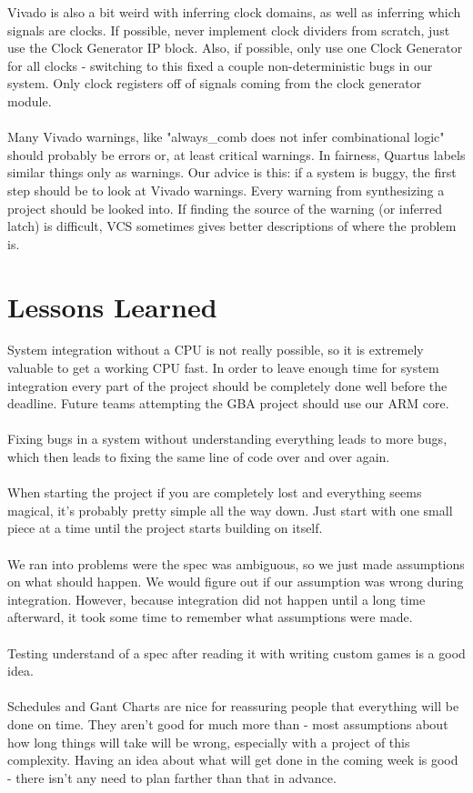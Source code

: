 \documentclass[11pt,a4paper]{article}
\begin{document}
	Vivado is also a bit weird with inferring clock domains, as well as inferring which signals are clocks. If possible, never implement clock dividers from scratch, just use the Clock Generator IP block. Also, if possible, only use one Clock Generator for all clocks - switching to this fixed a couple non-deterministic bugs in our system. Only clock registers off of signals coming from the clock generator module.\\\\
	Many Vivado warnings, like "always\_comb does not infer combinational logic" should probably be errors or, at least critical warnings. In fairness, Quartus labels similar things only as warnings. Our advice is this: if a system is buggy, the first step should be to look at Vivado warnings. Every warning from synthesizing a project should be looked into. If finding the source of the warning (or inferred latch) is difficult, VCS sometimes gives better descriptions of where the problem is. 
	
	\section{Lessons Learned}
	System integration without a CPU is not really possible, so it is extremely valuable to get a working CPU fast.  In order to leave enough time for system integration every part of the project should be completely done well before the deadline.  Future teams attempting the GBA project should use our ARM core. \\\\
	Fixing bugs in a system without understanding everything leads to more bugs, which then leads to fixing the same line of code over and over again.\\\\
	When starting the project if you are completely lost and everything seems magical, it's probably pretty simple all the way down.  Just start with one small piece at a time until the project starts building on itself.\\\\
	We ran into problems were the spec was ambiguous, so we just made assumptions on what should happen.  We would figure out if our assumption was wrong during integration.  However, because integration did not happen until a long time afterward, it took some time to remember what assumptions were made.\\\\ Testing understand of a spec after reading it with writing custom games is a good idea.\\\\
	Schedules and Gant Charts are nice for reassuring people that everything will be done on time. They aren't good for much more than - most assumptions about how long things will take will be wrong, especially with a project of this complexity. Having an idea about what will get done in the coming week is good - there isn't any need to plan farther than that in advance. \\\\
	
\end{document}

